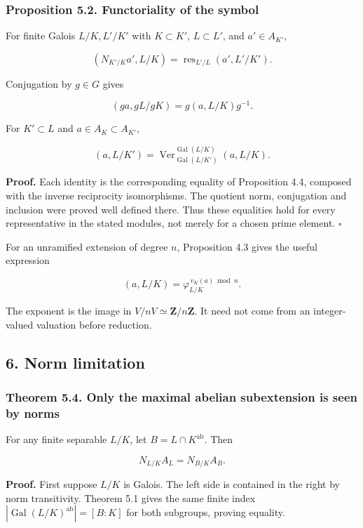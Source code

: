 \documentclass[11pt,a4paper]{article}
\begin{document}
\subsubsection{Proposition 5.2. Functoriality of the
symbol}\label{proposition-5.2.-functoriality-of-the-symbol}

For finite Galois \(L/K,L'/K'\) with \(K\subset K'\), \(L\subset L'\),
and \(a'\in A_{K'}\),

\[
(N_{K'/K}a',L/K)
=\operatorname{res}_{L'/L}(a',L'/K').
\tag{9}
\]

Conjugation by \(g\in G\) gives

\[
(ga,gL/gK)=g(a,L/K)g^{-1}.
\tag{10}
\]

For \(K'\subset L\) and \(a\in A_K\subset A_{K'}\),

\[
(a,L/K')=\operatorname{Ver}_{\operatorname{Gal}(L/K')}^{\operatorname{Gal}(L/K)}(a,L/K).
\tag{11}
\]

\textbf{Proof.} Each identity is the corresponding equality of
Proposition 4.4, composed with the inverse reciprocity isomorphisms. The
quotient norm, conjugation and inclusion were proved well defined there.
Thus these equalities hold for every representative in the stated
modules, not merely for a chosen prime element. \(\square\)

For an unramified extension of degree \(n\), Proposition 4.3 gives the
useful expression

\[
(a,L/K)=\varphi_{L/K}^{\,v_K(a)\bmod n}.
\tag{12}
\]

The exponent is the image in \(V/nV\simeq\mathbf Z/n\mathbf Z\). It need
not come from an integer-valued valuation before reduction.

\subsection{6. Norm limitation}\label{norm-limitation}

\subsubsection{Theorem 5.4. Only the maximal abelian subextension is
seen by
norms}\label{theorem-5.4.-only-the-maximal-abelian-subextension-is-seen-by-norms}

For any finite separable \(L/K\), let \(B=L\cap K^{\mathrm{ab}}\). Then

\[
N_{L/K}A_L=N_{B/K}A_B.
\tag{13}
\]

\textbf{Proof.} First suppose \(L/K\) is Galois. The left side is
contained in the right by norm transitivity. Theorem 5.1 gives the same
finite index \(|\operatorname{Gal}(L/K)^{\mathrm{ab}}|=[B:K]\) for both
subgroups, proving equality.
\end{document}
